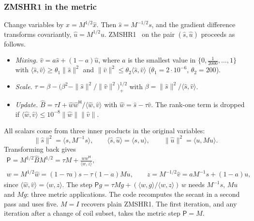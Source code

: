 \documentclass[11pt]{article}
\theoremstyle{remark}
\newcommand{\herm}{\mathsf H}
\begin{document}
\subsubsection*{ZMSHR1 in the metric}
Change variables by $x=M^{1/2}\hat x$. Then $\hat s=M^{-1/2}s$, and the gradient difference transforms covariantly, $\hat u=M^{1/2}u$.
ZMSHR1~\cite{hong2024} on the pair $(\hat s,\hat u)$ proceeds as follows.
\begin{itemize}
  \item \emph{Mixing.} $\hat v=a\hat s+(1-a)\hat u$, where $a$ is the smallest value in $\{0,\tfrac1{2000},\dots,1\}$ with $\langle\hat s,\hat v\rangle\ge\theta_1\|\hat s\|^2$ and $\|\hat v\|^2\le\theta_2\langle\hat s,\hat v\rangle$ ($\theta_1=2\cdot10^{-6}$, $\theta_2=200$).
  \item \emph{Scale.} $\tau=\beta-\bigl(\beta^2-\|\hat s\|^2/\|\hat v\|^2\bigr)_+^{1/2}$ with $\beta=\|\hat s\|^2/\langle\hat s,\hat v\rangle$.
  \item \emph{Update.} $\hat B=\tau I+\hat w\hat w^\herm/\langle\hat w,\hat v\rangle$ with $\hat w=\hat s-\tau\hat v$. The rank-one term is dropped if $\langle\hat w,\hat v\rangle\le10^{-8}\|\hat w\|\|\hat v\|$.
\end{itemize}
All scalars come from three inner products in the original variables:
\[
  \|\hat s\|^2=\langle s,M^{-1}s\rangle,\qquad\langle\hat s,\hat u\rangle=\langle s,u\rangle,\qquad\|\hat u\|^2=\langle u,Mu\rangle .
\]
Transforming back gives
\begin{equation}
\begin{gathered}
  \mathsf P=M^{1/2}\hat BM^{1/2}=\tau M+\frac{ww^\herm}{\langle w,z\rangle},\\
  w=M^{1/2}\hat w=(1-\tau a)s-\tau(1-a)Mu,\qquad z=M^{-1/2}\hat v=aM^{-1}s+(1-a)u ,
\end{gathered}
  \label{eq:zmshr1m}
\end{equation}
since $\langle\hat w,\hat v\rangle=\langle w,z\rangle$.
The step $\mathsf Pg=\tau Mg+(\langle w,g\rangle/\langle w,z\rangle)\,w$ needs $M^{-1}s$, $Mu$ and $Mg$: three metric applications. The code recomputes the secant in a second pass and uses five.
$M=I$ recovers plain ZMSHR1. The first iteration, and any iteration after a change of coil subset, takes the metric step $\mathsf P=M$.
\end{document}

